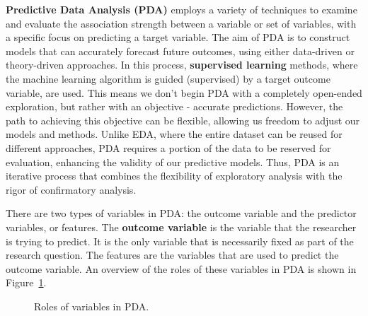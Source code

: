 \documentclass[
  letterpaper,
]{latex/krantz}
\theoremstyle{definition}
\theoremstyle{remark}
\begin{document}
\textbf{Predictive Data Analysis (PDA)} employs a variety of techniques
to examine and evaluate the association strength between a variable or
set of variables, with a specific focus on predicting a target variable.
The aim of PDA is to construct models that can accurately forecast
future outcomes, using either data-driven or theory-driven approaches.
In this process, \textbf{supervised learning} methods, where the machine
learning algorithm is guided (supervised) by a target outcome variable,
are used. This means we don't begin PDA with a completely open-ended
exploration, but rather with an objective - accurate predictions.
However, the path to achieving this objective can be flexible, allowing
us freedom to adjust our models and methods. Unlike EDA, where the
entire dataset can be reused for different approaches, PDA requires a
portion of the data to be reserved for evaluation, enhancing the
validity of our predictive models. Thus, PDA is an iterative process
that combines the flexibility of exploratory analysis with the rigor of
confirmatory analysis.

There are two types of variables in PDA: the outcome variable and the
predictor variables, or features. The \textbf{outcome variable} is the
variable that the researcher is trying to predict. It is the only
variable that is necessarily fixed as part of the research question. The
features are the variables that are used to predict the outcome
variable. An overview of the roles of these variables in PDA is shown in
Figure~\ref{fig-pda-variables}.

\begin{figure}[H]


\caption{\label{fig-pda-variables}Roles of variables in PDA.}

\end{figure}%
\end{document}

